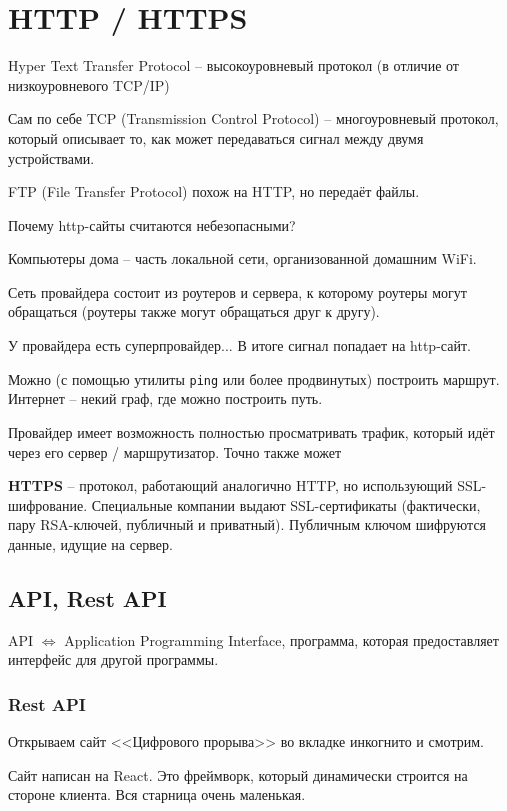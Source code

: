 \documentclass[main.tex]{subfiles}
\begin{document}
\section{HTTP / HTTPS}

Hyper Text Transfer Protocol -- высокоуровневый протокол (в отличие от низкоуровневого TCP/IP)

Сам по себе TCP (Transmission Control Protocol) -- многоуровневый протокол, который описывает то, как может передаваться сигнал между двумя устройствами.

FTP (File Transfer Protocol) похож на HTTP, но передаёт файлы.

Почему http-сайты считаются небезопасными?

Компьютеры дома -- часть локальной сети, организованной домашним WiFi.

Сеть провайдера состоит из роутеров и сервера, к которому роутеры могут обращаться (роутеры также могут обращаться друг к другу).

У провайдера есть суперпровайдер...
В итоге сигнал попадает на http-сайт.

Можно (с помощью утилиты \texttt{ping} или более продвинутых) построить маршрут. Интернет -- некий граф, где можно построить путь.

Провайдер имеет возможность полностью просматривать трафик, который идёт через его сервер / маршрутизатор.
Точно также может

\textbf{HTTPS} -- протокол, работающий аналогично HTTP, но использующий SSL-шифрование.
Специальные компании выдают SSL-сертификаты (фактически, пару RSA-ключей, публичный и приватный).
Публичным ключом шифруются данные, идущие на сервер.


\subsection{API, Rest API}

API $ \Leftrightarrow $ Application Programming Interface, программа, которая предоставляет интерфейс для другой программы.


\subsubsection{Rest API}

Открываем сайт <<Цифрового прорыва>> во вкладке инкогнито и смотрим.

Сайт написан на React.
Это фреймворк, который динамически строится на стороне клиента.
Вся старница очень маленькая.
\end{document}
